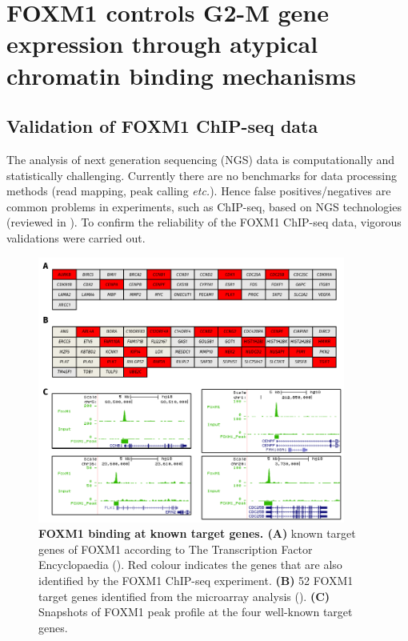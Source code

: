 \section{FOXM1 controls G2-M gene expression through atypical chromatin binding mechanisms}

\subsection{Validation of FOXM1 ChIP-seq data}

The analysis of next generation sequencing (NGS) data is computationally and statistically challenging. Currently there are no benchmarks for data processing methods (read mapping, peak calling \textit{etc.}). Hence false positives/negatives are common problems in experiments, such as ChIP-seq, based on NGS technologies (reviewed in \cite{pepke2009computation}). To confirm the reliability of the FOXM1 ChIP-seq data, vigorous validations were carried out.

\begin{figure}[!h]
    \centering
    \includegraphics[width=0.9\textwidth]{chapter3/figures_foxm1/fig16.pdf}
    \caption[FOXM1 binding at known target genes]{\textbf{FOXM1 binding at known target genes. (A)} known target genes of FOXM1 according to The Transcription Factor Encyclopaedia (\cite{yusuf2012the}). Red colour indicates the genes that are also identified by the FOXM1 ChIP-seq experiment. \textbf{(B)} 52 FOXM1 target genes identified from the microarray analysis (\cite{laoukili2005foxm1}). \textbf{(C)} Snapshots of FOXM1 peak profile at the four well-known target genes.}
    \label{fig:fig16}
\end{figure}

